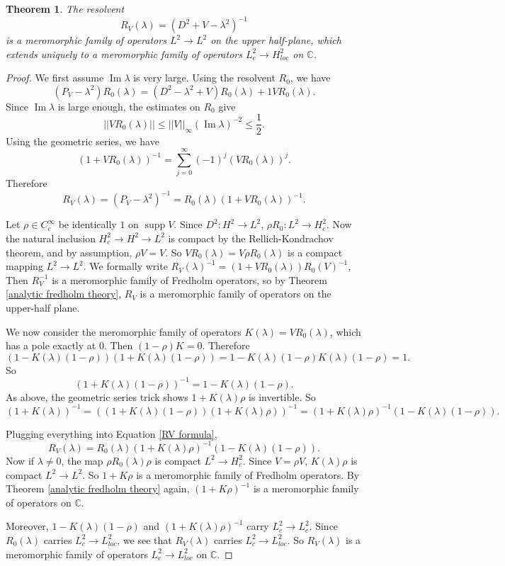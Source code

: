 \documentclass[12pt]{report}
\newcommand{\CC}{\mathbb{C}}
\newcommand{\supp}{\operatorname{supp}}
\renewcommand{\Im}{\operatorname{Im}}
\newtheorem{theorem}{Theorem}[chapter]
\theoremstyle{definition}
\begin{document}
\begin{theorem}
The resolvent
$$R_V(\lambda) = (D^2 + V - \lambda^2)^{-1}$$
is a meromorphic family of operators $L^2 \to L^2$ on the upper half-plane, which extends uniquely to a meromorphic family of operators $L^2_c \to H^2_{loc}$ on $\CC$.
\end{theorem}
\begin{proof}
We first assume $\Im \lambda$ is very large. Using the resolvent $R_0$, we have
$$(P_V - \lambda^2)R_0(\lambda) = (D^2 - \lambda^2 + V) R_0(\lambda) + 1 VR_0(\lambda).$$
Since $\Im \lambda$ is large enough, the estimates on $R_0$ give
$$||VR_0(\lambda)|| \leq ||V||_\infty (\Im \lambda)^{-2} \leq \frac{1}{2}.$$
Using the geometric series, we have
$$(1 + VR_0(\lambda))^{-1} = \sum_{j=0}^\infty (-1)^j (VR_0(\lambda))^j.$$
Therefore
\begin{equation}
\label{RV formula}
R_V(\lambda) = (P_V - \lambda^2)^{-1} = R_0(\lambda)(1 + VR_0(\lambda))^{-1}.
\end{equation}

Let $\rho \in C^\infty_c$ be identically $1$ on $\supp V$. Since $D^2: H^2 \to L^2$, $\rho R_0: L^2 \to H^2_c$. Now the natural inclusion $H^2_c \to H^2 \to L^2$ is compact by the Rellich-Kondrachov theorem, and by assumption, $\rho V = V$. So $VR_0(\lambda) = V\rho R_0(\lambda)$ is a compact mapping $L^2 \to L^2$. We formally write $R_V(\lambda)^{-1} = (1+VR_0(\lambda))R_0(V)^{-1}$, Then $R_V^{-1}$ is a meromorphic family of Fredholm operators, so by Theorem \ref{analytic fredholm theory}, $R_V$ is a meromorphic family of operators on the upper-half plane.

We now consider the meromorphic family of operators $K(\lambda) = VR_0(\lambda)$, which has a pole exactly at $0$. Then $(1-\rho)K = 0$. Therefore
$$(1 - K(\lambda)(1 - \rho))(1 + K(\lambda)(1 - \rho)) = 1 - K(\lambda)(1 - \rho)K(\lambda)(1 - \rho) = 1.$$
So
$$(1 + K(\lambda)(1 - \rho))^{-1} = 1 - K(\lambda)(1 - \rho).$$
As above, the geometric series trick shows $1 + K(\lambda)\rho$ is invertible. So
$$(1 + K(\lambda))^{-1} = ((1+ K(\lambda)(1 - \rho))(1 + K(\lambda)\rho))^{-1} = (1 + K(\lambda)\rho)^{-1}(1 - K(\lambda)(1 - \rho)).$$

Plugging everything into Equation \ref{RV formula},
$$R_V(\lambda) = R_0(\lambda)(1 + K(\lambda)\rho)^{-1}(1 - K(\lambda)(1 - \rho)).$$
Now if $\lambda \neq 0$, the map $\rho R_0(\lambda) \rho$ is compact $L^2 \to H^2_c$. Since $V = \rho V$, $K(\lambda)\rho$ is compact $L^2 \to L^2$. So $1 + K\rho$ is a meromorphic family of Fredholm operators. By Theorem \ref{analytic fredholm theory} again, $(1 + K\rho)^{-1}$ is a meromorphic family of operators on $\CC$.

Moreover, $1 - K(\lambda)(1 - \rho)$ and $(1 + K(\lambda)\rho)^{-1}$ carry $L^2_c \to L^2_c$. Since $R_0(\lambda)$ carries $L^2_c \to L^2_{loc}$, we see that $R_V(\lambda)$ carries $L^2_c \to L^2_{loc}$. So $R_V(\lambda)$ is a meromorphic family of operators $L^2_c \to L^2_{loc}$ on $\CC$.
\end{proof}
\end{document}
